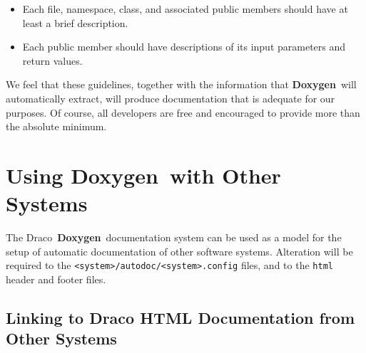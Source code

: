 \documentclass[11pt]{nmemo}
\newcommand{\draco}{{\normalfont\sffamily Draco}}
\newcommand{\doxy}{{\normalfont\bfseries Doxygen}}
\begin{document}
\begin{itemize}
\item Each file, namespace, class, and associated public members
  should have at least a brief description.
\item Each public member should have descriptions of its input
  parameters and return values.
\end{itemize}

We feel that these guidelines, together with the information that
\doxy\ will automatically extract, will produce documentation that is
adequate for our purposes. Of course, all developers are free and
encouraged to provide more than the absolute minimum.


\section{Using \doxy\ with Other Systems}

The \draco\ \doxy\ documentation system can be used as a model for
the setup of automatic documentation of other software systems. 
Alteration will be 
required to the \texttt{<system>/autodoc/<system>.config} files, and
to the \texttt{html} header and footer files. 


\subsection{Linking to Draco HTML Documentation from Other Systems}
\end{document}
